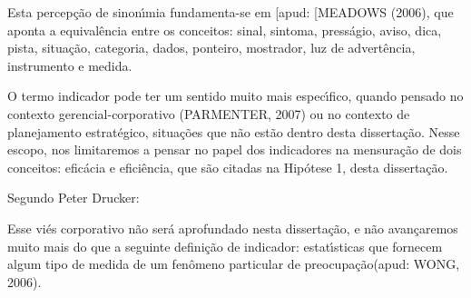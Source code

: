 \documentclass[
12pt,		%
openright,	%
twoside,  %
a4paper,			%
chapter=TITLE,		%
english,			%
french,				%
spanish,			%
brazil				%
]{USPSC-classe/USPSC}
\begin{document}
Esta percep\c{c}\~ao de sinon\'{\i}mia fundamenta-se em [apud: [MEADOWS (2006), que aponta a equival\^encia entre os conceitos: sinal, sintoma, press\'agio, aviso, dica, pista, situa\c{c}\~ao, categoria, dados, ponteiro, mostrador, luz de advert\^encia, instrumento e medida.

















O termo \textquotedbl  indicador \textquotedbl  pode ter um sentido muito mais espec\'{\i}fico, quando pensado no contexto gerencial-corporativo (PARMENTER, 2007) ou no contexto de planejamento estrat\'egico, situa\c{c}\~oes que n\~ao est\~ao dentro desta disserta\c{c}\~ao. Nesse escopo, nos limitaremos a pensar no papel dos indicadores na mensura\c{c}\~ao de dois conceitos: efic\'acia e efici\^encia, que s\~ao citadas na Hip\'otese 1, desta disserta\c{c}\~ao.

















Segundo Peter Drucker:


















\noindent\begin{center}\mbox{\centering{}}\end{center}


Esse vi\'es corporativo n\~ao ser\'a aprofundado nesta disserta\c{c}\~ao, e n\~ao avan\c{c}aremos muito mais do que a seguinte defini\c{c}\~ao de indicador: \textquotedbl estat\'{\i}sticas que fornecem algum tipo de medida de um fen\^omeno particular de preocupa\c{c}\~ao\textquotedbl  (apud: WONG, 2006).
\end{document}
